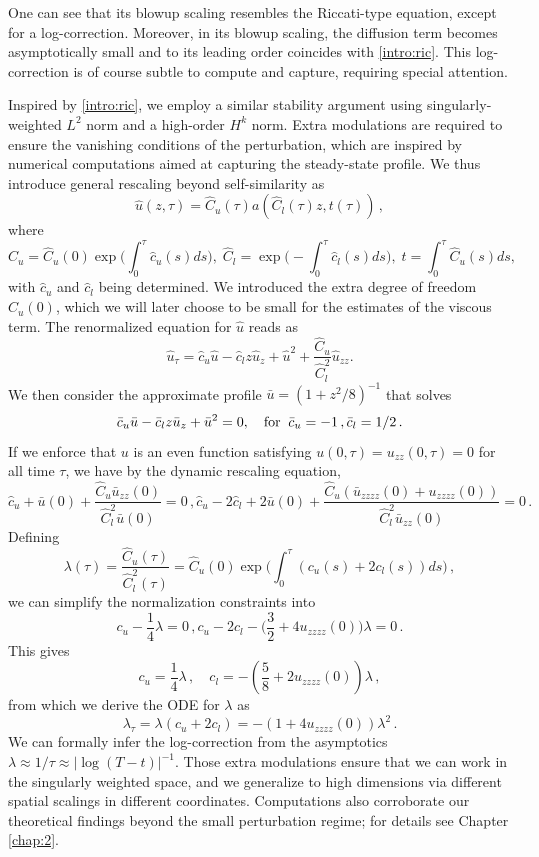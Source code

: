\documentclass[12pt]{caltech_thesis}
\numberwithin{equation}{section}
\begin{document}
One can see that its blowup scaling resembles the Riccati-type equation, except for a log-correction. Moreover, in its blowup scaling, the diffusion term becomes asymptotically small and to its leading order coincides with \eqref{intro:ric}. This log-correction is of course subtle to compute and capture, requiring special attention.

Inspired by \eqref{intro:ric}, we employ a similar stability argument using singularly-weighted $L^2$ norm and a high-order $H^k$ norm. Extra modulations are required to ensure the vanishing conditions of the perturbation, which are inspired by numerical computations aimed at capturing the steady-state profile. We thus introduce general rescaling beyond self-similarity as $$\hat{u}(z,\tau)=\hat{C}_u(\tau) a(\hat{C}_l(\tau)z,t(\tau))\,,$$ where 
\begin{equation*}
\hat{C}_u=\hat{C}_u(0)\exp{\Big(\int_0^\tau \hat{c}_u(s) ds\Big)},\;  \hat{C}_l=\exp{\Big(-\int_0^\tau\hat{c}_l(s) ds\Big)},\; t=\int_0^\tau \hat{C}_u(s) ds,
\end{equation*}
with $\hat c_u$ and $\hat c_l$ being determined. We introduced the extra degree of freedom $\hat{C}_u(0)$, which we will later choose to be small for the estimates of the viscous term.
The renormalized equation for $\hat u$ reads as
\begin{equation*}
    \hat{u}_\tau=\hat{c}_u \hat{u}-\hat{c}_l z\hat{u}_z+\hat{u}^2+\frac{\hat{C}_u}{\hat{C}_l^2}\hat{u}_{zz}.
\end{equation*}
We then consider the approximate profile $\bar{u}=(1+z^2/8)^{-1}$ that solves
    $$ \bar{c}_u\bar{u}-\bar{c}_l z\bar{u}_z+\bar{u}^2=0, \quad \textup{for}\;\; \bar{c}_u=-1\,,\bar{c}_l=1/2\,.$$
    If we enforce that $u$  is an even function satisfying $u(0, \tau) = u_{zz}(0, \tau) = 0$ for all time $\tau$, we have by the dynamic rescaling equation,
\begin{equation*}
    \hat{c}_u+\bar{u}(0)+\frac{\hat{C}_u \bar{u}_{zz}(0)}{\hat{C}_l^2 \bar{u}(0)}=0\,,\hat{c}_u-2\hat{c}_l+2\bar{u}(0)+\frac{\hat{C}_u (\bar{u}_{zzzz}(0)+{u}_{zzzz}(0))}{\hat{C}_l^2 \bar{u}_{zz}(0)}=0\,.
\end{equation*}
Defining 
$$\lambda (\tau)=\frac{\hat{C}_u (\tau)}{\hat{C}_l^2(\tau)}=\hat{C}_u(0)\exp{\Big(\int_0^\tau ({c_u(s)}+2c_l(s)) ds\Big)}\,,$$
we can simplify the normalization constraints into $${c_u}-\frac{1}{4}\lambda=0\,,{c_u}-2{c_l}-\big(\frac{ 3}{2}+4{u}_{zzzz}(0)\big)\lambda=0\,.$$
This gives 
\begin{equation*}
{c_u}=\frac{1}{4}\lambda\,, \quad {c_l}=-(\frac{ 5}{8}+2{u}_{zzzz}(0))\lambda\,,\end{equation*}
from which we {derive} the ODE for $\lambda$ as 
\begin{equation*}
    \lambda_\tau=\lambda(c_u+2c_l)=-(1+4{u}_{zzzz}(0))\lambda^2\,.
\end{equation*}
We can formally infer the log-correction from the asymptotics $\lambda\approx 1/\tau\approx|\log{(T-t)}|^{-1}$. Those extra modulations ensure that we can work in the singularly weighted space, and we generalize to high dimensions via different spatial scalings in different coordinates. Computations also corroborate our theoretical findings beyond the small perturbation regime; for details see Chapter \ref{chap:2}.
\end{document}
